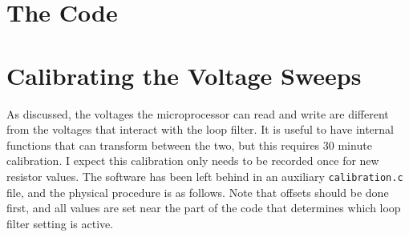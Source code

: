 \documentclass[10pt]{report}
\begin{document}
\section{The Code}

\begin{spacing}{1.0}

\end{spacing}


\section{Calibrating the Voltage Sweeps}
As discussed, the voltages the microprocessor can read and write are different from the voltages that interact with the loop filter. It is useful to have internal functions that can transform between the two, but this requires 30 minute calibration. I expect this calibration only needs to be recorded once for new resistor values. The software has been left behind in an auxiliary \texttt{calibration.c} file, and the physical procedure is as follows. Note that offsets should be done first, and all values are set near the part of the code that determines which loop filter setting is active.
\end{document}
